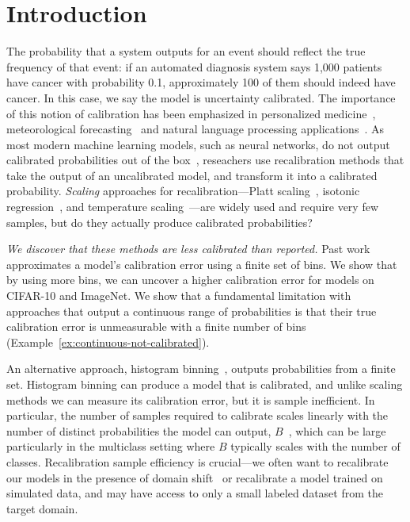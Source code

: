 
\section{Introduction}

The probability that a system outputs for an event should reflect the true frequency of that event: if an automated diagnosis system says 1,000 patients have cancer with probability 0.1, approximately 100 of them should indeed have cancer.
In this case, we say the model is uncertainty calibrated. The importance of this notion of calibration has been emphasized in personalized medicine~\cite{jiang2012calibrating}, meteorological forecasting~\cite{murphy1973vector, murphy1977reliability, degroot1983forecasters,gneiting2005weather, brocker2009decomposition} and natural language processing applications~\cite{nguyen2015posterior, card2018calibration}.
As most modern machine learning models, such as neural networks, do not output calibrated probabilities out of the box~\cite{guo2017calibration, zadrozny2001calibrated, kuleshov2018accurate}, reseachers use recalibration methods that take the output of an uncalibrated model, and transform it into a calibrated probability.
\emph{Scaling} approaches for recalibration---Platt scaling~\cite{platt1999probabilistic}, isotonic regression~\cite{zadrozny2002transforming}, and temperature scaling~\cite{guo2017calibration}---are widely used and require very few samples, but do they actually produce calibrated probabilities?

\emph{We discover that these methods are less calibrated than reported.} Past work approximates a model's calibration error using a finite set of bins. We show that by using more bins, we can uncover a higher calibration error for models on CIFAR-10 and ImageNet.
We show that a fundamental limitation with approaches that output a continuous range of probabilities is that their true calibration error is unmeasurable with a finite number of bins (Example~\ref{ex:continuous-not-calibrated}).

An alternative approach, histogram binning~\cite{zadrozny2001calibrated}, outputs probabilities from a finite set.
Histogram binning can produce a model that is calibrated, and unlike scaling methods we can measure its calibration error, but it is sample inefficient.
In particular, the number of samples required to calibrate scales linearly with the number of distinct probabilities the model can output, $B$~\cite{naeini2014binary}, which can be large particularly in the multiclass setting where $B$ typically scales with the number of classes.
Recalibration sample efficiency is crucial---we often want to recalibrate our models in the presence of domain shift~\cite{hendrycks2019anomaly} or recalibrate a model trained on simulated data, and may have access to only a small labeled dataset from the target domain.

